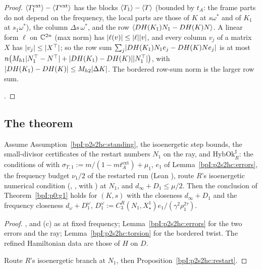 \begin{proof}
\label{stepI:p2s2hc:bl}
$\langle T_1^{\mathrm{ext}}\rangle-\langle T^{\mathrm{ext}}\rangle$ has the blocks $\langle T_1\rangle-\langle T\rangle$ (bounded by $t_A$: the frame parts do not depend on the frequency, the local parts are
those of $K$ at $s\omega^*$ and of $K_1$ at $s_1\omega^*$), the column $\Delta s\,\omega^*$, and the row $\langle DH(K_1)N_1-DH(K)N\rangle$. A linear form $\ell$ on $\mathbb{C}^{2n}$ (max norm) has $\lvert \ell(v)\rvert\le\lvert \ell\rvert\lvert v\rvert$, and every
column $v_j$ of a matrix $X$ has $\lvert v_j\rvert\le\lvert X^\top\rvert$; so the row sum $\sum_j\lvert DH(K_1)N_1e_j-DH(K)Ne_j\rvert$ is at most
$n\bigl(M_{h1}\lvert N_1^\top-N^\top\rvert+\lvert DH(K_1)-DH(K)\rvert\lvert N_1^\top\rvert\bigr)$, with $\lvert DH(K_1)-DH(K)\rvert\le M_{h2}\lvert \Delta K\rvert$. The bordered row-sum norm is the
larger row sum.

\label{stepI:p2s2hc:nm}
.
\end{proof}

\subsection{The theorem}\label{bpI:p2s2hc:sec-g1}

\begin{theorem}\label{bpI:p2s2hc:g1}
Assume Assumption~\ref{bpI:p2s2hc:standing}, the isoenergetic step bounds, the small-divisor certificates of the restart numbers $N_1$ on the ray, and
$\mathrm{HybOk}^{\mathrm I}_R$: the conditions of  with $\sigma_{T,1}:=m/(1-mt_A^{\mathrm{ext}})+\mu_1$, $e_1$ of Lemma~\ref{bpI:p2s2hc:errors}, the frequency budget
$\nu_1/2$ of the restarted run (Lean ), route $R$'s isoenergetic numerical condition (, ,  with
) at $N_1$, and $d_\infty+D_1\le\mu/2$. Then the conclusion of Theorem~\ref{bpI:p0:g1} holds for $(K,s)$ with the closeness $d_\infty+D_1$ and the
frequency closeness $d_\omega+D_1^\omega$, $D_1^\omega:=C_3^R(N_1,X_\star^1)e_1/(\gamma^2\rho_1^{2\tau})$.
\end{theorem}

\begin{proof}
\label{stepI:p2s2hc:hyp}
,  and (c) as at fixed frequency; Lemma~\ref{bpI:p2s2hc:errors} for the two errors and the ray;
Lemma~\ref{bpI:p2s2hc:torsion} for the bordered twist. The refined Hamiltonian data are those of $H$ on $D$.

\label{stepI:p2s2hc:rs2}
Route $R$'s isoenergetic branch at $N_1$, then Proposition~\ref{bpI:p2s2hc:restart}.
\end{proof}

